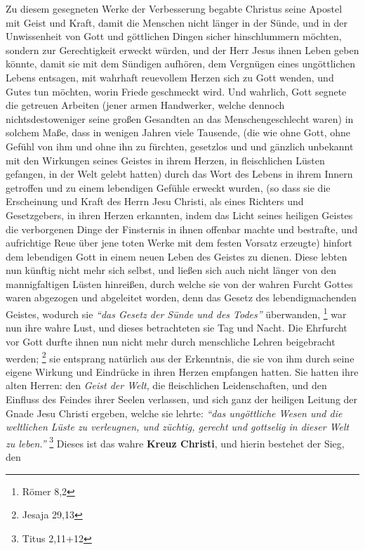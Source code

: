 Zu diesem gesegneten Werke der Verbesserung begabte Christus seine Apostel mit
Geist und Kraft, damit die Menschen nicht länger in der Sünde, und in der
Unwissenheit von Gott und göttlichen Dingen sicher hinschlummern möchten,
sondern zur Gerechtigkeit erweckt würden, und der Herr Jesus ihnen Leben geben
könnte, damit sie mit dem Sündigen aufhören, dem Vergnügen eines ungöttlichen Lebens
entsagen, mit wahrhaft reuevollem Herzen sich zu Gott wenden, und Gutes tun
möchten, worin Friede geschmeckt wird. Und wahrlich, Gott segnete die getreuen
Arbeiten (jener armen Handwerker, welche dennoch nichtsdestoweniger seine
großen Gesandten an das Menschengeschlecht waren) in solchem Maße, dass in
wenigen Jahren viele Tausende, (die wie ohne Gott, ohne Gefühl von ihm und ohne
ihn
zu fürchten, gesetzlos und und gänzlich unbekannt mit den Wirkungen seines
Geistes in ihrem Herzen, in fleischlichen Lüsten gefangen, in der Welt gelebt
hatten) durch das Wort des Lebens in ihrem Innern getroffen und zu einem
lebendigen Gefühle erweckt wurden, (so dass sie die Erscheinung und Kraft des
Herrn Jesu Christi, als eines Richters und Gesetzgebers, in ihren Herzen
erkannten, indem das Licht seines heiligen Geistes die verborgenen Dinge der
Finsternis in ihnen offenbar machte und bestrafte, und aufrichtige Reue über
jene toten Werke mit dem festen Vorsatz erzeugte) hinfort dem lebendigen Gott
in einem neuen Leben des Geistes zu dienen. Diese lebten nun künftig nicht mehr
sich selbst, und ließen sich auch nicht länger von den mannigfaltigen Lüsten
hinreißen, durch welche sie von der wahren Furcht Gottes waren abgezogen und
abgeleitet worden, denn das Gesetz des lebendigmachenden Geistes, wodurch sie
\textit{"`das Gesetz der Sünde und des Todes"'} überwanden,
\footnote{Römer 8,2}
 war nun
ihre wahre Lust, und dieses betrachteten sie Tag und Nacht. Die Ehrfurcht vor
Gott durfte ihnen nun nicht mehr durch menschliche Lehren beigebracht werden;
\footnote{Jesaja 29,13}  sie entsprang
natürlich aus der Erkenntnis, die sie von
ihm durch seine eigene Wirkung und Eindrücke in ihren Herzen empfangen
hatten. Sie hatten ihre alten Herren: den \textit{Geist der Welt}, die
fleischlichen
Leidenschaften, und den Einfluss des Feindes ihrer Seelen verlassen, und sich
ganz der heiligen Leitung der Gnade Jesu Christi ergeben, welche sie lehrte:
\textit{"`das ungöttliche Wesen und die weltlichen Lüste zu verleugnen, und
züchtig, gerecht und gottselig in dieser Welt zu leben."'}
\footnote{Titus 2,11+12}
Dieses ist das wahre \textbf{Kreuz Christi}, und hierin bestehet der Sieg, den
